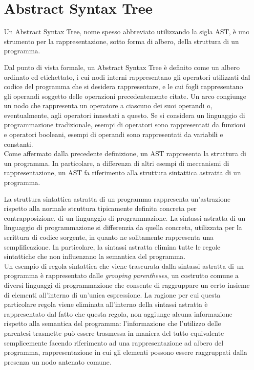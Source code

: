 \section{Abstract Syntax Tree}
\label{abstract-syntax-tree}

Un Abstract Syntax Tree, nome spesso abbreviato utilizzando la sigla AST, è uno
strumento per la rappresentazione, sotto forma di albero, della struttura di un
programma.

Dal punto di vista formale, un Abstract Syntax Tree è definito come un albero
ordinato ed etichettato, i cui nodi interni rappresentano gli operatori
utilizzati dal codice del programma che si desidera rappresentare, e le cui
fogli rappresentano gli operandi soggetto delle operazioni precedentemente
citate. Un arco congiunge un nodo che rappresenta un operatore a ciascuno dei
suoi operandi o, eventualmente, agli operatori innestati a questo. Se si
considera un linguaggio di programmazione tradizionale, esempi di operatori sono
rappresentati da funzioni e operatori booleani, esempi di operandi sono
rappresentati da variabili e constanti.\\

Come affermato dalla precedente definizione, un AST rappresenta la struttura di
un programma. In particolare, a differenza di altri esempi di meccanismi di
rappresentazione, un AST fa riferimento alla struttura sintattica astratta di
un programma.

La struttura sintattica astratta di un programma rappresenta un’astrazione
rispetto alla normale struttura tipicamente definita concreta per
contrapposizione, di un linguaggio di programmazione. La sintassi astratta di un
linguaggio di programmazione si differenzia da quella concreta, utilizzata per
la scrittura di codice sorgente, in quanto ne solitamente rappresenta una
semplificazione. In particolare, la sintassi astratta elimina tutte le regole
sintattiche che non influenzano la semantica del programma.\\

Un esempio di regola sintattica che viene trascurata dalla sintassi astratta di
un programma è rappresentato dalle \textit{grouping parentheses}, un costrutto
comune a diversi linguaggi di programmazione che consente di raggruppare un
certo insieme di elementi all'interno di un'unica espressione. La ragione per
cui questa particolare regola viene eliminata all’interno della sintassi
astratta è rappresentato dal fatto che questa regola, non aggiunge alcuna
informazione rispetto alla semantica del programma: l’informazione che
l’utilizzo delle parentesi trasmette può essere trasmessa in maniera del tutto
equivalente semplicemente facendo riferimento ad una rappresentazione ad albero
del programma, rappresentazione in cui gli elementi possono essere raggruppati
dalla presenza un nodo antenato comune.

